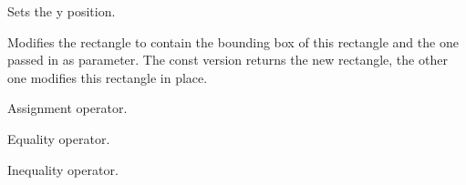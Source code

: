 Sets the y position.


\label{wxrectunion}



Modifies the rectangle to contain the bounding box of this rectangle and the
one passed in as parameter. The const version returns the new rectangle, the
other one modifies this rectangle in place.


\label{wxrectassign}


Assignment operator.


\label{wxrectequal}


Equality operator.


\label{wxrectnotequal}


Inequality operator.

